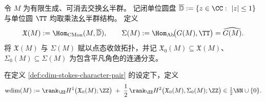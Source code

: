 \begin{definition}\label{def:cdim-stokes-character-pair}
令 \(M\) 为有限生成、可消去交换幺半群。
记闭单位圆盘 \(\overline{\mathbb D}:=\{z\in\CC:\ |z|\le 1\}\) 与单位圆 \(\TT\) 均取乘法幺半群结构。
定义
\[
\mathfrak X(M):=\Hom_{\mathrm{CMon}}(M,\overline{\mathbb D}),
\qquad
\Sigma(M):=\Hom_{\mathrm{Ab}}\!\bigl(G(M),\TT\bigr)=\widehat{G(M)}.
\]
将 \(\mathfrak X(M)\) 与 \(\Sigma(M)\) 赋以点态收敛拓扑，并记
\(\mathfrak X_0(M)\subseteq \mathfrak X(M)\)、\(\Sigma_0(M)\subseteq \Sigma(M)\)
为包含平凡角色的连通分支。
\end{definition}

\begin{definition}\label{def:cdim-stokes-weighted-dimension}
在定义 \ref{def:cdim-stokes-character-pair} 的设定下，定义
\[
\mathrm{wdim}(M)
:=\rank_{\ZZ}H^{1}\bigl(\mathfrak X_0(M);\ZZ\bigr)
\;+\;\frac12\,\rank_{\ZZ}H^{2}\bigl(\mathfrak X_0(M),\Sigma_0(M);\ZZ\bigr)
\in\tfrac12\NN\cup\{0\}.
\]
\end{definition}

